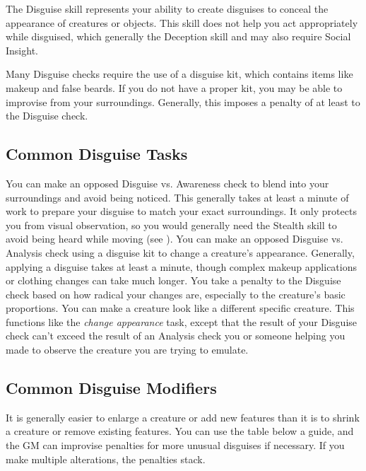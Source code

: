 \newpage
{}
  The Disguise skill represents your ability to create disguises to conceal the appearance of creatures or objects.
  This skill does not help you act appropriately while disguised, which generally the Deception skill and may also require Social Insight.

  Many Disguise checks require the use of a disguise kit, which contains items like makeup and false beards.
  If you do not have a proper kit, you may be able to improvise from your surroundings.
  Generally, this imposes a penalty of at least  to the Disguise check.

  \subsection{Common Disguise Tasks}
     You can make an opposed Disguise vs. Awareness check to blend into your surroundings and avoid being noticed.
    This generally takes at least a minute of work to prepare your disguise to match your exact surroundings.
    It only protects you from visual observation, so you would generally need the Stealth skill to avoid being heard while moving (see ).
    You can make an opposed Disguise vs. Analysis check using a disguise kit to change a creature's appearance.
    Generally, applying a disguise takes at least a minute, though complex makeup applications or clothing changes can take much longer.
    You take a penalty to the Disguise check based on how radical your changes are, especially to the creature's basic proportions.
     You can make a creature look like a different specific creature.
    This functions like the \textit{change appearance} task, except that the result of your Disguise check can't exceed the result of an Analysis check you or someone helping you made to observe the creature you are trying to emulate.

  \subsection{Common Disguise Modifiers}
    It is generally easier to enlarge a creature or add new features than it is to shrink a creature or remove existing features.
    You can use the table below a guide, and the GM can improvise penalties for more unusual disguises if necessary.
    If you make multiple alterations, the penalties stack.

